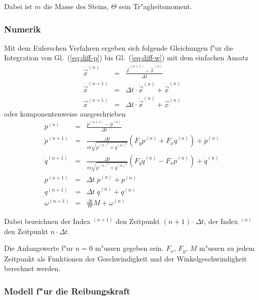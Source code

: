 \documentclass[a4paper]{report}
\newcommand{\eqlab}[1]{\label{eq:#1}}
\newcommand{\eqref}[1]{Gl.~(\ref{eq:#1})}
\newcommand{\NONUMBER}{\nonumber}
\newcommand{\NONUMBER}{}
\begin{document}
Dabei ist $ m $ die Masse des Steins, $ \Theta $ sein Tr"agheitsmoment.

\subsubsection{Numerik}

Mit dem Eulerschen Verfahren ergeben sich folgende Gleichungen f"ur die
Integration von \eqref{diff-p} bis \eqref{diff-w} mit dem einfachen Ansatz
%
\begin{eqnarray}
\ddot{\vec{x}}^{(n)}  &=& \frac{ \dot{\vec{x}}^{(n+1)} - \dot{\vec{x}}^{(n)}
                               }{ \Delta t } \NONUMBER\\
\dot{\vec{x}}^{(n+1)} &=& \Delta t \cdot \ddot{\vec{x}}^{(n)} + \dot{\vec{x}}^{(n)} \NONUMBER\\
     \vec{x} ^{(n+1)} &=& \Delta t \cdot  \dot{\vec{x}}^{(n)} +      \vec{x} ^{(n)} \NONUMBER
%
\end{eqnarray}
oder komponentenweise ausgeschrieben
\begin{eqnarray}
\ddot{p}^{(n)}	&=& \frac{\dot{p}^{(n+1)} - \dot{p}^{(n)}}{\Delta t}
	\eqlab{euler-1}\\
\dot{p}^{(n+1)} &=& \frac{\Delta t}%
		    {m \sqrt{ \dot{p}^{(n)^2} +  \dot{q}^{(n)^2} }}
		    \left(F_y \dot{p}^{(n)} + F_x \dot{q}^{(n)} \right) +
		    \dot{p}^{(n)}
	\eqlab{euler-2}\\
\dot{q}^{(n+1)} &=& \frac{\Delta t}%
		    {m \sqrt{ \dot{p}^{(n)^2} +  \dot{q}^{(n)^2} }}
		    \left(F_y \dot{q}^{(n)} - F_x \dot{p}^{(n)} \right) +
		    \dot{q}^{(n)}
	\eqlab{euler-3}\\
p^{(n+1)} &=& \Delta t\; \dot{p}^{(n)} + p^{(n)}
	\eqlab{euler-4}\\
q^{(n+1)} &=& \Delta t\; \dot{q}^{(n)} + q^{(n)}
	\eqlab{euler-5}\\
\omega^{(n+1)} &=& \frac{\Delta t}{\Theta} M + \omega^{(n)}
	\eqlab{euler-6}
\end{eqnarray}

Dabei bezeichnen der Index $ {}^{(n+1)} $ den Zeitpunkt $ (n+1) \cdot \Delta t $,
der Index $ {}^{(n)} $ den Zeitpunkt $ n \cdot \Delta t $.

Die Anfangswerte f"ur $ n=0 $ m"ussen gegeben sein. $ F_x $, $ F_y $, $ M $
m"ussen zu jedem Zeitpunkt als Funktionen der Geschwindigkeit und der
Winkelgeschwindigkeit berechnet werden.

\subsubsection{Modell f"ur die Reibungskraft}
\end{document}
